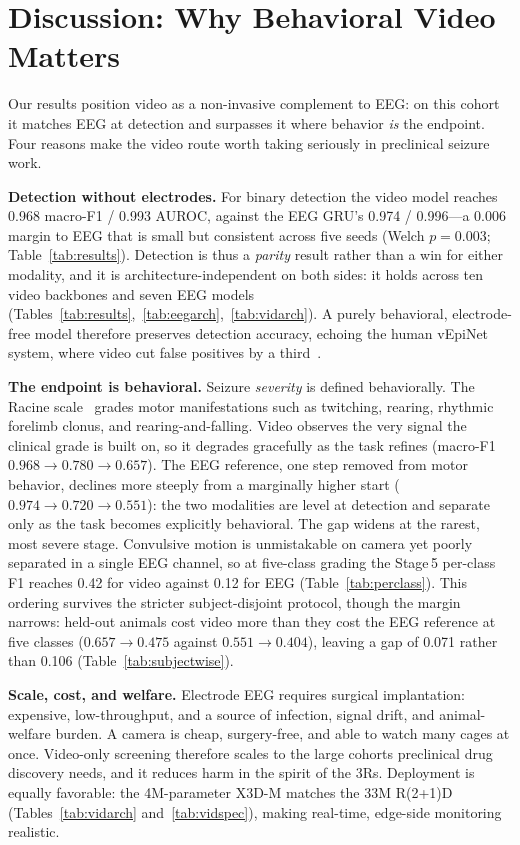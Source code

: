 \section{Discussion: Why Behavioral Video Matters}
\label{sec:discussion}

Our results position video as a non-invasive complement to EEG: on this cohort
it matches EEG at detection and surpasses it where behavior \emph{is} the
endpoint. Four reasons make the video route worth taking seriously in
preclinical seizure work.

\noindent\textbf{Detection without electrodes.}
For binary detection the video model reaches 0.968 macro-F1 / 0.993
AUROC, against the EEG GRU's 0.974 / 0.996---a 0.006 margin to EEG that is small
but consistent across five seeds (Welch $p{=}0.003$; Table~\ref{tab:results}).
Detection is thus a \emph{parity} result rather than a win for either modality, and it is architecture-independent
on both sides: it holds across ten video backbones and seven EEG
models (Tables~\ref{tab:results},~\ref{tab:eegarch},~\ref{tab:vidarch}). A
purely behavioral, electrode-free model therefore preserves detection accuracy,
echoing the human vEpiNet system, where video cut false
positives by a third~\cite{vepinet2024}.

\noindent\textbf{The endpoint is behavioral.}
Seizure \emph{severity} is defined behaviorally. The Racine
scale~\cite{racine1972} grades motor manifestations such as twitching, rearing,
rhythmic forelimb clonus, and rearing-and-falling. Video observes the very
signal the clinical grade is built on, so it degrades gracefully as the task
refines (macro-F1 $0.968\!\to\!0.780\!\to\!0.657$). The EEG reference, one step
removed from motor behavior, declines more steeply from a marginally higher start
($0.974\!\to\!0.720\!\to\!0.551$): the two modalities are level at detection and
separate only as the task becomes explicitly behavioral. The gap widens at the
rarest, most severe stage. Convulsive motion is unmistakable on camera yet poorly
separated in a single EEG channel, so at five-class grading the Stage\,5 per-class
F1 reaches 0.42 for video against 0.12 for EEG (Table~\ref{tab:perclass}). This
ordering survives the stricter subject-disjoint protocol, though the margin narrows:
held-out animals cost video more than they cost the EEG reference at five classes
($0.657\!\to\!0.475$ against $0.551\!\to\!0.404$), leaving a gap of 0.071 rather
than 0.106 (Table~\ref{tab:subjectwise}).

\noindent\textbf{Scale, cost, and welfare.}
Electrode EEG requires surgical implantation: expensive, low-throughput, and a
source of infection, signal drift, and animal-welfare burden. A camera is cheap,
surgery-free, and able to watch many cages at once. Video-only screening
therefore scales to the large cohorts preclinical drug discovery needs, and it
reduces harm in the spirit of the 3Rs. Deployment is equally favorable: the
4M-parameter X3D-M matches the 33M R(2+1)D (Tables~\ref{tab:vidarch}
and~\ref{tab:vidspec}), making
real-time, edge-side monitoring realistic.

